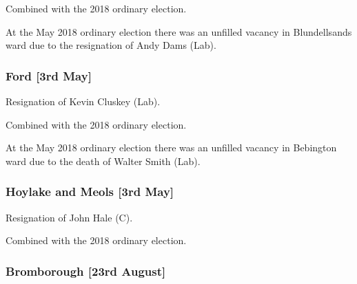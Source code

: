 \begin{resultsiii}
Combined with the 2018 ordinary election.


At the May 2018 ordinary election there was an unfilled vacancy in Blundellsands ward due to the resignation of Andy Dams (Lab).

\subsubsection*{Ford \hspace*{\fill}\nolinebreak[1]%
\enspace\hspace*{\fill}
[3rd May]}


Resignation of Kevin Cluskey (Lab).

Combined with the 2018 ordinary election.


At the May 2018 ordinary election there was an unfilled vacancy in Bebington ward due to the death of Walter Smith (Lab).

\subsubsection*{Hoylake and Meols \hspace*{\fill}\nolinebreak[1]%
\enspace\hspace*{\fill}
[3rd May]}


Resignation of John Hale (C).

Combined with the 2018 ordinary election.

\subsubsection*{Bromborough \hspace*{\fill}\nolinebreak[1]%
\enspace\hspace*{\fill}
[23rd August]}



\end{resultsiii}
